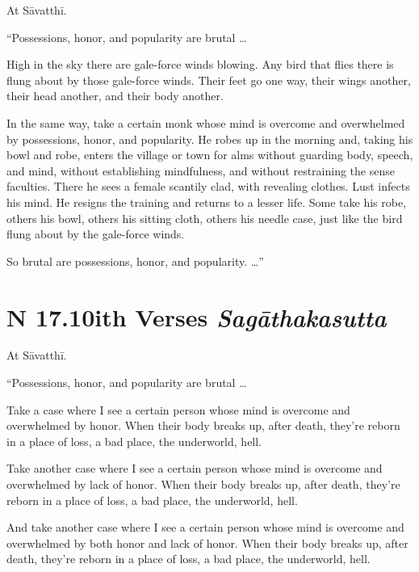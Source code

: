 \documentclass[12pt,openany]{book}%
\newcommand*{\suttatitleacronym}[1]{\smaller[2]{#1}\vspace*{.3em}}
\newcommand*{\suttatitletranslation}[1]{\linebreak{#1}}
\newcommand*{\suttatitleroot}[1]{\linebreak\smaller[2]\itshape{#1}}
\newcommand*{\tocacronym}[1]{\hspace*{-3.3em}{#1}\quad}
\newcommand*{\toctranslation}[1]{#1}
\newcommand*{\tocroot}[1]{(\textit{#1})}
\begin{document}
At \textsanskrit{Sāvatthī}. 

“Possessions, honor, and popularity are brutal … 

High in the sky there are gale-force winds blowing. Any bird that flies there is flung about by those gale-force winds. Their feet go one way, their wings another, their head another, and their body another. 

In the same way, take a certain monk whose mind is overcome and overwhelmed by possessions, honor, and popularity. He robes up in the morning and, taking his bowl and robe, enters the village or town for alms without guarding body, speech, and mind, without establishing mindfulness, and without restraining the sense faculties. There he sees a female scantily clad, with revealing clothes. Lust infects his mind. He resigns the training and returns to a lesser life. Some take his robe, others his bowl, others his sitting cloth, others his needle case, just like the bird flung about by the gale-force winds. 

So brutal are possessions, honor, and popularity. …” 

%
\section*{{\suttatitleacronym SN 17.10}{\suttatitletranslation With Verses }{\suttatitleroot Sagāthakasutta}}
\addcontentsline{toc}{section}{\tocacronym{SN 17.10} \toctranslation{With Verses } \tocroot{Sagāthakasutta}}

At \textsanskrit{Sāvatthī}. 

“Possessions, honor, and popularity are brutal … 

Take a case where I see a certain person whose mind is overcome and overwhelmed by honor. When their body breaks up, after death, they’re reborn in a place of loss, a bad place, the underworld, hell. 

Take another case where I see a certain person whose mind is overcome and overwhelmed by lack of honor. When their body breaks up, after death, they’re reborn in a place of loss, a bad place, the underworld, hell. 

And take another case where I see a certain person whose mind is overcome and overwhelmed by both honor and lack of honor. When their body breaks up, after death, they’re reborn in a place of loss, a bad place, the underworld, hell. 
\end{document}
